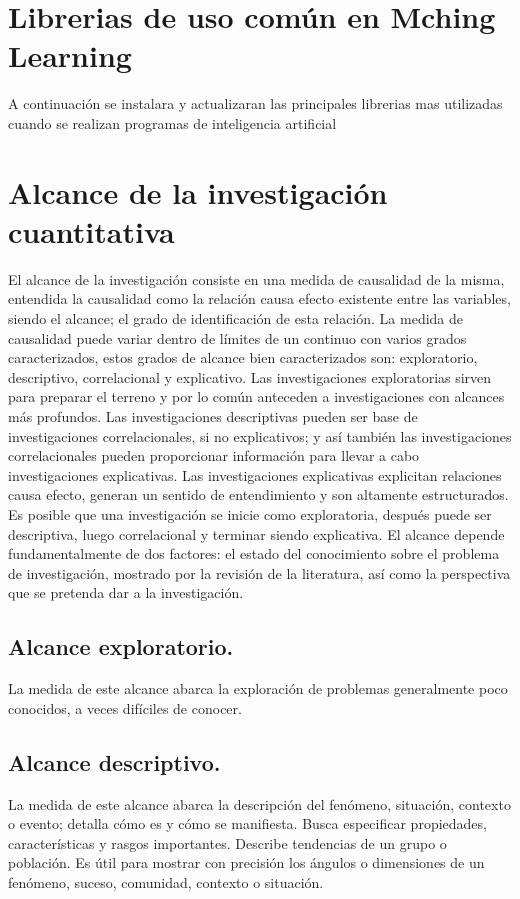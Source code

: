 \section{Librerias de uso común en Mching Learning}
A continuación se instalara y actualizaran las principales librerias mas utilizadas cuando se realizan programas de inteligencia artificial

\section{Alcance de la investigación cuantitativa}
El alcance de la investigación consiste en una medida de causalidad de la misma, entendida la causalidad como la relación causa efecto existente entre las variables, siendo el alcance; el grado de identificación de esta relación. La medida de causalidad puede variar dentro de límites de un continuo con varios grados caracterizados, estos grados de alcance bien caracterizados son: exploratorio, descriptivo, correlacional y explicativo. Las investigaciones exploratorias sirven para preparar el terreno y por lo común anteceden a investigaciones con alcances más profundos. Las investigaciones descriptivas pueden ser base de investigaciones correlacionales, si no explicativos; y así también las investigaciones correlacionales pueden proporcionar información para llevar a cabo investigaciones explicativas. Las investigaciones explicativas explicitan relaciones causa efecto, generan un sentido de entendimiento y son altamente estructurados. Es posible que una investigación se inicie como exploratoria, después puede ser descriptiva, luego correlacional y terminar siendo explicativa. El alcance depende fundamentalmente de dos factores: el estado del conocimiento sobre el problema de investigación, mostrado por la revisión de la literatura, así como la perspectiva que se pretenda dar a la investigación.

\subsection{Alcance exploratorio.}
La medida de este alcance abarca la exploración de problemas generalmente poco conocidos, a veces difíciles de conocer.

\subsection{Alcance descriptivo.}
La medida de este alcance abarca la descripción del fenómeno, situación, contexto o evento; detalla cómo es y cómo se manifiesta. Busca especificar propiedades, características y rasgos importantes. Describe tendencias de un grupo o población. Es útil para mostrar con precisión los ángulos o dimensiones de un fenómeno, suceso, comunidad, contexto o situación.

